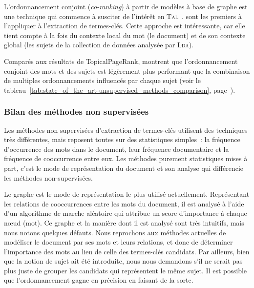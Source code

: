         L'ordonnancement conjoint (\textit{co-ranking}) à partir de modèles à
        base de graphe est une technique qui commence à susciter de l'intérêt en
        \textsc{Tal}~\cite{wan2011corankingsummarization,yan2012corankingtweetrecommendation,liu2014corankingopinionmining}.
         sont les premiers à l'appliquer à
        l'extraction de termes-clés. Cette approche est intéressante, car elle
        tient compte à la fois du contexte local du mot (le document) et de son
        contexte global (les sujets de la collection de données analysée par
        \textsc{Lda}).

        Comparés aux résultats de TopicalPageRank,
         montrent que l'ordonnancement
        conjoint des mots et des sujets est légèrement plus performant que la
        combinaison de multiples ordonnancements influencés par chaque sujet
        (voir le tableau~\ref{tab:state_of_the_art-unsupervised_methods_comparison},
        page~\pageref{tab:state_of_the_art-unsupervised_methods_comparison}).

      \subsubsection{Bilan des méthodes non supervisées}
      \label{subsubsec:main-state_of_the_art-automatic_keyphrase_extraction-unsupervised_keyphrase_extraction-bilan}
        Les méthodes non supervisées d'extraction de termes-clés utilisent des
        techniques très différentes, mais reposent toutes sur des statistiques
        simples~: la fréquence d'occurrence des mots dans le document, leur
        fréquence documentaire et la fréquence de cooccurrence entre eux. Les
        méthodes purement statistiques mises à part, c'est le mode de
        représentation du document et son analyse qui différencie les méthodes
        non-supervisées.
        
        Le graphe est le mode de représentation le plus utilisé actuellement.
        Représentant les relations de cooccurrences entre les mots du document,
        il est analysé à l'aide d'un algorithme de marche aléatoire qui attribue
        un score d'importance à chaque n\oe{}ud (mot). Ce graphe et la manière
        dont il est analysé sont très intuitifs, mais nous notons quelques
        défauts. Nous reprochons aux méthodes actuelles de modéliser le document
        par ses mots et leurs relations, et donc de déterminer l'importance des
        mots au lieu de celle des termes-clés candidats. Par ailleurs, bien que
        la notion de sujet ait été introduite, nous nous demandons s'il ne
        serait pas plus juste de grouper les candidats qui représentent le même
        sujet. Il est possible que l'ordonnancement gagne en précision en
        faisant de la sorte.

